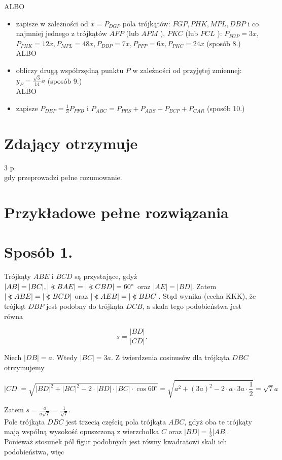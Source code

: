 \documentclass[10pt]{article}
\newcommand\Varangle{\mathop{{<\!\!\!\!\!\text{\small)}}\:}\nolimits}
\begin{document}
ALBO

\begin{itemize}
  \item zapisze w zależności od $x=P_{D G P}$ pola trójkątów: $F G P, P H K, M P L, D B P$ i co najmniej jednego z trójkątów $A F P$ (lub $A P M$ ), $P K C$ (lub $P C L$ ): $P_{F G P}=3 x$, $P_{P H K}=12 x, P_{M P L}=48 x, P_{D B P}=7 x, P_{P F P}=6 x, P_{P K C}=24 x$ (sposób 8.)\\
ALBO
  \item obliczy drugą współrzędną punktu $P$ w zależności od przyjętej zmiennej: $y_{P}=\frac{\sqrt{3}}{14} a$ (sposób 9.)\\
ALBO
  \item zapisze $P_{D B P}=\frac{1}{3} P_{P F B}$ i $P_{A B C}=P_{P R S}+P_{A B S}+P_{B C P}+P_{C A R}$ (sposób 10.)
\end{itemize}

\section*{Zdający otrzymuje}
3 p.\\
gdy przeprowadzi pełne rozumowanie.

\section*{Przykładowe pełne rozwiązania}
\section*{Sposób 1.}
Trójkąty $A B E$ i $B C D$ są przystające, gdyż $|A B|=|B C|,|\Varangle B A E|=|\Varangle C B D|=60^{\circ}$ oraz $|A E|=|B D|$. Zatem $|\Varangle A B E|=|\Varangle B C D|$ oraz $|\Varangle A E B|=|\Varangle B D C|$. Stąd wynika (cecha KKK), że trójkąt $D B P$ jest podobny do trójkąta $D C B$, a skala tego podobieństwa jest równa

$$
s=\frac{|B D|}{|C D|} .
$$

Niech $|D B|=a$. Wtedy $|B C|=3 a$. Z twierdzenia cosinusów dla trójkąta $D B C$ otrzymujemy

$$
|C D|=\sqrt{|B D|^{2}+|B C|^{2}-2 \cdot|B D| \cdot|B C| \cdot \cos 60^{\circ}}=\sqrt{a^{2}+(3 a)^{2}-2 \cdot a \cdot 3 a \cdot \frac{1}{2}}=\sqrt{7} a
$$

Zatem $s=\frac{a}{a \sqrt{7}}=\frac{1}{\sqrt{7}}$.\\
Pole trójkąta $D B C$ jest trzecią częścią pola trójkąta $A B C$, gdyż oba te trójkąty mają wspólną wysokość opuszczoną z wierzchołka $C$ oraz $|B D|=\frac{1}{3}|A B|$.\\
Ponieważ stosunek pól figur podobnych jest równy kwadratowi skali ich podobieństwa, więc
\end{document}

